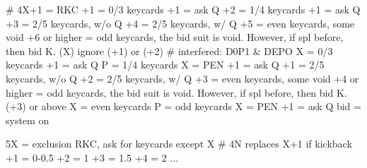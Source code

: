 # 4X+1 = RKC
+1 = 0/3 keycards
    +1 = ask Q
+2 = 1/4 keycards
    +1 = ask Q
+3 = 2/5 keycards, w/o Q
+4 = 2/5 keycards, w/ Q
+5 = even keycards, some void
+6 or higher = odd keycards, the bid suit is void. However, if spl before, then bid K.
(X)
    ignore
(+1) or (+2) # interfered: D0P1 & DEPO
    X = 0/3 keycards
        +1 = ask Q
    P = 1/4 keycards
        X = PEN
        +1 = ask Q
    +1 = 2/5 keycards, w/o Q
    +2 = 2/5 keycards, w/ Q
    +3 = even keycards, some void
    +4 or higher = odd keycards, the bid suit is void. However, if spl before, then bid K.
(+3) or above
    X = even keycards
    P = odd keycards
        X = PEN
        +1 = ask Q
    bid = system on

5X = exclusion RKC, ask for keycards except X  # 4N replaces X+1 if kickback
+1 = 0-0.5
+2 = 1
+3 = 1.5
+4 = 2
...